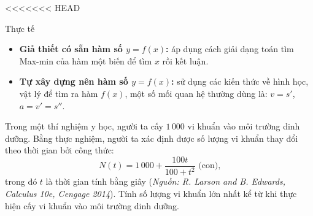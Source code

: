 <<<<<<< HEAD
\begin{dang}{Thực tế}
    \begin{itemize}
        \item \textbf{Giả thiết có sẵn hàm số $y=f(x)$:} áp dụng cách giải dạng toán tìm Max-min của hàm một biến để tìm $x$ rồi kết luận.
        \item \textbf{Tự xây dựng nên hàm số $y=f(x)$:} sử dụng các kiến thức về hình học, vật lý để tìm ra hàm $f(x)$, một số mối quan hệ thường dùng là: $v=s'$, $a=v'=s''$.
    \end{itemize}
\end{dang}
\begin{vd}
    Trong một thí nghiệm y học, người ta cấy $1\,000$ vi khuẩn vào môi trường dinh dưỡng. Bằng thực nghiệm, người ta xác định được số lượng vi khuẩn thay đổi theo thời gian bởi công thức: $$N(t)=1\,000+\dfrac{100t}{100+t^2}\text{ (con),}$$ trong đó $t$ là thời gian tính bằng giây (\textit{Nguồn: R. Larson and B. Edwards, Calculus 10e, Cengage 2014}). Tính số lượng vi khuẩn lớn nhất kể từ khi thực hiện cấy vi khuẩn vào môi trường dinh dưỡng.
\end{vd}
